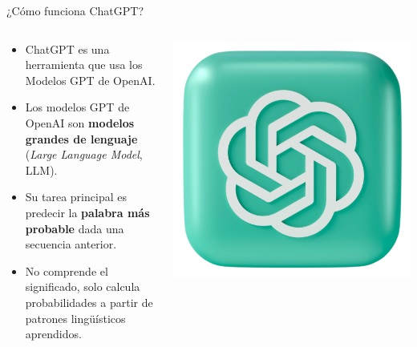\begin{frame}{¿Cómo funciona ChatGPT?}
\begin{columns}
\begin{block}{}
\begin{itemize}
    \item ChatGPT es una herramienta que usa los Modelos GPT de OpenAI.
    \item Los modelos GPT de OpenAI son \textbf{ modelos grandes de lenguaje} (\textit{Large Language Model}, LLM).
    \item Su tarea principal es predecir la \textbf{palabra más probable} dada una secuencia anterior.
    \item No comprende el significado, solo calcula probabilidades a partir de patrones lingüísticos aprendidos.
\end{itemize}
\end{block}
\includegraphics[width=0.9\linewidth]{Figuras/Fig04.png} 
\end{columns}
\end{frame}


